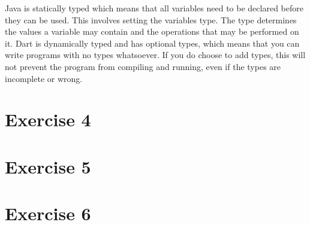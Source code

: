 \documentclass[a4paper,10pt]{article}
\begin{document}
Java is statically typed which means that all variables need to be declared before they can be used. This involves setting the variables type. The type determines the values a variable may contain and the operations that may be performed on it. Dart is dynamically typed and has optional types, which means that you can write programs with no types whatsoever. If you do choose to add types, this will not prevent the program from compiling and running, even if the types are incomplete or wrong.\\

\section*{Exercise 4}


\section*{Exercise 5}


\section*{Exercise 6}
\end{document}
